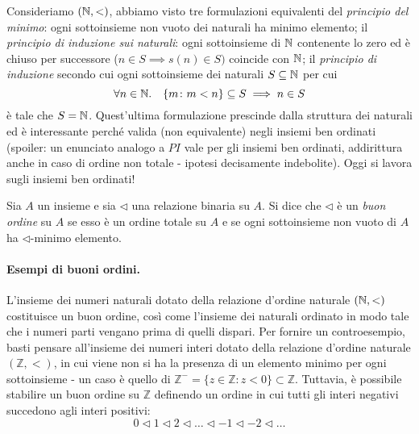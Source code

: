 Consideriamo \((\mathbb{N}, <)\), abbiamo visto tre formulazioni equivalenti del \emph{principio del minimo}: ogni sottoinsieme non vuoto dei naturali ha minimo elemento; il \emph{principio di induzione sui naturali}: ogni sottoinsieme di \(\mathbb{N}\) contenente lo zero ed è chiuso per successore (\(n \in S \implies s(n) \in S)\) coincide con \(\mathbb{N}\); il \emph{principio di induzione} secondo cui ogni sottoinsieme dei naturali \(S \subseteq \mathbb{N}\) per cui
\begin{equation}
  \forall n \in \mathbb{N}.\quad \lbrace m \colon m < n\rbrace \subseteq S \implies n \in S
\end{equation}
è tale che \(S = \mathbb{N}\). Quest'ultima formulazione prescinde dalla struttura dei naturali ed è interessante perché valida (non equivalente) negli insiemi ben ordinati (spoiler: un enunciato analogo a \(PI\) vale per gli insiemi ben ordinati, addirittura anche in caso di ordine non totale - ipotesi decisamente indebolite). Oggi si lavora sugli insiemi ben ordinati!

\begin{dfn}
  Sia \(A\) un insieme e sia \(\lhd\) una relazione binaria su \(A\). Si dice che \(\lhd\) è un \emph{buon ordine} su \(A\) se esso è un ordine totale su \(A\) e se ogni sottoinsieme non vuoto di \(A\) ha \(\lhd\)-minimo elemento.
\end{dfn}

\paragraph{Esempi di buoni ordini.} L'insieme dei numeri naturali dotato della relazione d'ordine naturale \((\mathbb{N}, <)\) costituisce un buon ordine, così come l'insieme dei naturali ordinato in modo tale che i numeri parti vengano prima di quelli dispari. Per fornire un controesempio, basti pensare all'insieme dei numeri interi dotato della relazione d'ordine naturale \((\mathbb{Z}, <)\), in cui viene non si ha la presenza di un elemento minimo per ogni sottoinsieme - un caso è quello di \(\mathbb{Z}^- = \lbrace z \in \mathbb{Z} \colon z < 0 \rbrace \subset \mathbb{Z}\). Tuttavia, è possibile stabilire un buon ordine su \(\mathbb{Z}\) definendo un ordine in cui tutti gli interi negativi succedono agli interi positivi:
\[
0 \lhd 1 \lhd 2 \lhd \dots \lhd -1 \lhd -2 \lhd \dots
\]

